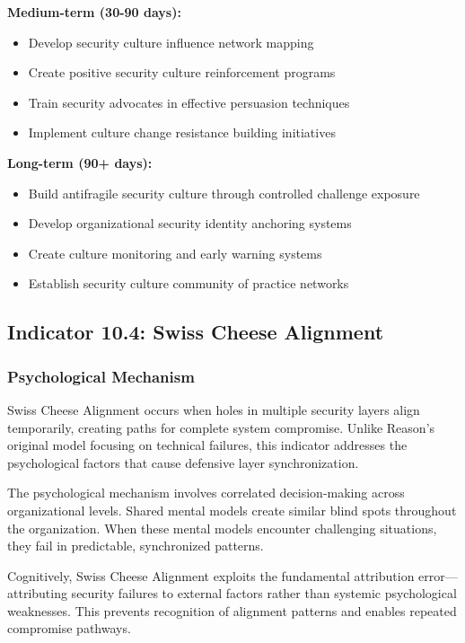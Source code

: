 \documentclass[11pt,a4paper]{article}
\begin{document}
\textbf{Medium-term (30-90 days):}
\begin{itemize}
\item Develop security culture influence network mapping
\item Create positive security culture reinforcement programs
\item Train security advocates in effective persuasion techniques
\item Implement culture change resistance building initiatives
\end{itemize}

\textbf{Long-term (90+ days):}
\begin{itemize}
\item Build antifragile security culture through controlled challenge exposure
\item Develop organizational security identity anchoring systems
\item Create culture monitoring and early warning systems
\item Establish security culture community of practice networks
\end{itemize}

\subsection{Indicator 10.4: Swiss Cheese Alignment}

\subsubsection{Psychological Mechanism}

Swiss Cheese Alignment occurs when holes in multiple security layers align temporarily, creating paths for complete system compromise. Unlike Reason's\cite{reason1997} original model focusing on technical failures, this indicator addresses the psychological factors that cause defensive layer synchronization.

The psychological mechanism involves correlated decision-making across organizational levels. Shared mental models\cite{johnson2005} create similar blind spots throughout the organization. When these mental models encounter challenging situations, they fail in predictable, synchronized patterns.

Cognitively, Swiss Cheese Alignment exploits the fundamental attribution error—attributing security failures to external factors rather than systemic psychological weaknesses. This prevents recognition of alignment patterns and enables repeated compromise pathways.
\end{document}
